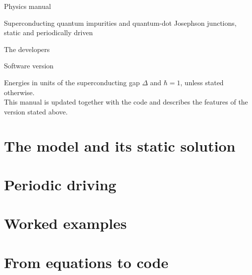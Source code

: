 \documentclass[11pt,a4paper,oneside,DIV=12,parskip=half-,numbers=noenddot,bibliography=totoc]{scrbook}
\begin{document}
\frontmatter
\begin{titlepage}
  \centering
  \vspace*{3cm}
  {\Huge\bfseries \pkg\par}
  \vspace{.6cm}
  {\LARGE Physics manual\par}
  \vspace{1.2cm}
  {\large Superconducting quantum impurities and quantum-dot Josephson junctions,\\[2pt]
   static and periodically driven\par}
  \vspace{2.5cm}
  {\large The \pkg{} developers\par}
  \vspace{.4cm}
  {\normalsize Software version \pkgversion\par}
  {\small\manualedition\par}
  \vfill
  {\small Energies in units of the superconducting gap $\Delta$ and $\hbar=1$, unless stated otherwise.\\
   This manual is updated together with the code and describes the features of the
   version stated above.\par}
\end{titlepage}


\tableofcontents

\mainmatter
\part{The model and its static solution}








\part{Periodic driving}





\part{Worked examples}\label{part:examples}










\part{From equations to code}


\appendix


\backmatter
\printbibliography[heading=bibintoc,title={References}]
\end{document}
